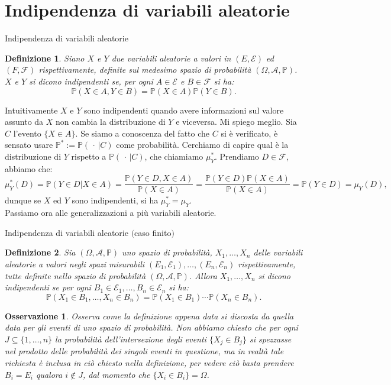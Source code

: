 \documentclass[11pt]{book}
\theoremstyle{Definizione}
\newtheorem*{mydef}{Definizione}
\theoremstyle{TeoremaProposizioneLemmaCorollario}
\theoremstyle{OsservazioneNota}
\newtheorem{myobs}{Osservazione}[section]
\renewcommand{\P}{\mathbb{P}}
\begin{document}
\section{Indipendenza di variabili aleatorie}
\begin{boxdef}{Indipendenza di variabili aleatorie}
\begin{mydef}
Siano $X$ e $Y$ due variabili aleatorie a valori in $(E,\mathcal{E})$ ed $(F,\mathcal{F})$ rispettivamente, definite sul medesimo spazio di probabilità $(\Omega,\mathcal{A},\P)$. $X$ e $Y$ si dicono indipendenti se, per ogni $A\in \mathcal{E}$ e $B\in \mathcal{F}$ si ha:
$$
\P(X\in A,Y\in B) = \P(X\in A)\P(Y\in B).
$$ 
\end{mydef}
\end{boxdef}
\noindent
Intuitivamente $X$ e $Y$ sono indipendenti quando avere informazioni sul valore assunto da $X$ non cambia la distribuzione di $Y$ e viceversa. Mi spiego meglio.
Sia $C$ l'evento $\{X\in A\}$. Se siamo a conoscenza del fatto che $C$ si è verificato, è sensato usare $\P^*:=\P(\,\cdot\,|C)$ come probabilità. Cerchiamo di capire qual è la distribuzione di $Y$ rispetto a $\P(\,\cdot\,|C)$, che chiamiamo $\mu_Y^*$. Prendiamo $D \in \mathcal{F}$, abbiamo che:
$$
\mu_Y^*(D) = \P(Y\in D|X\in A) = \frac{\P(Y\in D,X\in A)}{\P(X\in A)} = \frac{\P(Y\in D)\P(X\in A)}{\P(X\in A)} = \P(Y\in D)= \mu_Y(D), 
$$
dunque se $X$ ed $Y$ sono indipendenti, si ha $\mu_Y^* = \mu_Y$.\\
\indent
Passiamo ora alle generalizzazioni a più variabili aleatorie.
\begin{boxdef}{Indipendenza di variabili aleatorie $($caso finito$)$}
\begin{mydef}
Sia $(\Omega,\mathcal{A},\P)$ uno spazio di probabilità, $X_1,\dots,X_n$ delle variabili aleatorie a valori negli spazi misurabili $(E_1,\mathcal{E}_1),\dots,(E_n,\mathcal{E}_n)$ rispettivamente, tutte definite nello spazio di probabilità $(\Omega,\mathcal{A},\P)$. Allora $X_1,\dots,X_n$ si dicono indipendenti se per ogni $B_1\in \mathcal{E}_1,\dots,B_n\in \mathcal{E}_n$ si ha:
$$
\P(X_1\in B_1,\dots,X_n\in B_n) = \P(X_1\in B_1) \cdots \P(X_n\in B_n).
$$
\end{mydef}
\end{boxdef}
\begin{myobs}
Osserva come la definizione appena data si discosta da quella data per gli eventi di uno spazio di probabilità. Non abbiamo chiesto che per ogni $J\subseteq \{1,\dots,n\}$ la probabilità dell'intersezione degli eventi $\{X_j\in B_j\}$ si spezzasse nel prodotto delle probabilità dei singoli eventi in questione, ma in realtà tale richiesta è inclusa in ciò chiesto nella definizione, per vedere ciò basta prendere $B_i = E_i$ qualora $i\notin J$, dal momento che $\{X_i\in B_i\} = \Omega$.
\end{myobs}
\end{document}

